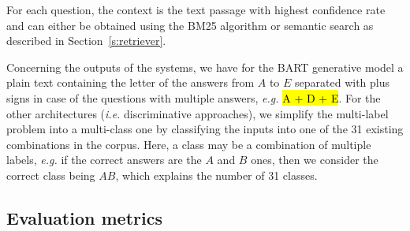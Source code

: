 \documentclass[11pt]{article}
\begin{document}
For each question, the context is the text passage with highest confidence rate and can either be obtained using the BM25 algorithm or semantic search as described in Section~\ref{s:retriever}.



Concerning the outputs of the systems, we have for the BART generative model a plain text containing the letter of the answers from $A$ to $E$ separated with plus signs in case of the questions with multiple answers, {\it e.g.} \hl{A + D + E}. For the other architectures ({\it i.e.} discriminative approaches), we simplify the multi-label problem into a multi-class one by classifying the inputs into one of the 31 existing combinations in the corpus. Here, a class may be a combination of multiple labels, {\it e.g.} if the correct answers are the $A$ and $B$ ones, then we consider the correct class being $AB$, which explains the number of 31 classes.

\begin{table*}[htb!]
\caption{\label{table:ResultsTableHammingScore}Performance (in \%) on the test set using the Hamming score and EMR metrics.}
\end{table*}

\subsection{Evaluation metrics}
\end{document}
